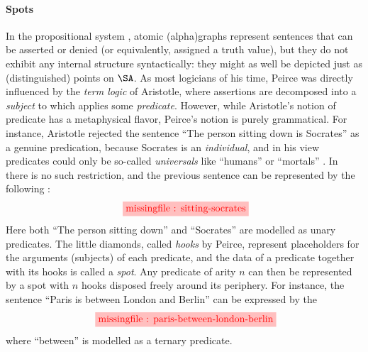 \begin{scope}
\paragraph{Spots} In the propositional system , atomic \kl(alpha){graphs}
represent sentences that can be asserted or denied (or equivalently, assigned a
truth value), but they do not exhibit any internal structure syntactically: they
might as well be depicted just as (distinguished) points on $\SA$. As most
logicians of his time, Peirce was directly influenced by the \emph{term logic}
of Aristotle, where assertions are decomposed into a \emph{subject} to which
applies some \emph{predicate}. However, while Aristotle's notion of predicate
has a metaphysical flavor, Peirce's notion is purely grammatical. For instance,
Aristotle rejected the sentence ``The person sitting down is Socrates'' as a
genuine predication, because Socrates is an \emph{individual}, and in his view
predicates could only be so-called \emph{universals} like ``humans'' or
``mortals'' . In  there is no such
restriction, and the previous sentence can be represented by the following
:
\begin{equation}
  \tikzfig{1}{0.5}{sitting-socrates} \label{eq:sitting-socrates}
\end{equation}
Here both ``The person sitting down'' and ``Socrates'' are modelled as unary
predicates. The little diamonds, called \emph{hooks} by Peirce, represent
placeholders for the arguments (subjects) of each predicate, and the data of a
predicate together with its hooks is called a \emph{spot}. Any predicate of arity $n$ can then be represented by a spot with
$n$ hooks disposed freely around its periphery. For instance, the sentence
``Paris is between London and Berlin'' can be expressed by the 
\begin{equation*}
  \tikzfig{1}{0.5}{paris-between-london-berlin} \label{eq:paris-between-london-berlin}
\end{equation*}
where ``between'' is modelled as a ternary predicate.


\end{scope}
